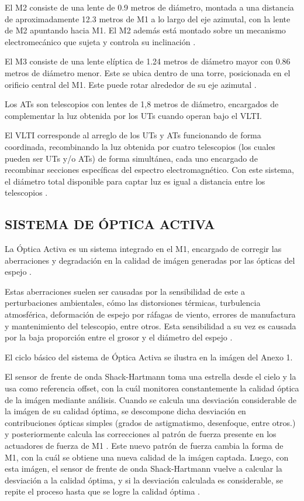 El M2 consiste de una lente de 0.9 metros de diámetro, montada a una distancia de aproximadamente 12.3 metros de M1 a lo largo del eje azimutal, con la lente de M2 apuntando hacia M1. El M2 además está montado sobre un mecanismo electromecánico que sujeta y controla su inclinación \cite{eso2011m2}.

El M3 consiste de una lente elíptica de 1.24 metros de diámetro mayor con 0.86 metros de diámetro menor. Este se ubica dentro de una torre, posicionada en el orificio central del M1. Este puede rotar alrededor de su eje azimutal \cite{eso2011m1}.

Los ATs son telescopios con lentes de 1,8 metros de diámetro, encargados de complementar la luz obtenida por los UTs cuando operan bajo el VLTI.

El VLTI corresponde al arreglo de los UTs y ATs funcionando de forma coordinada, recombinando la luz obtenida por cuatro telescopios (los cuales pueden ser UTs y/o ATs) de forma simultánea, cada uno encargado de recombinar secciones específicas del espectro electromagnético. Con este sistema, el diámetro total disponible para captar luz es igual a distancia entre los telescopios \cite{eso1998vlt}.

\subsection{SISTEMA DE ÓPTICA ACTIVA}
La Óptica Activa es un sistema integrado en el M1, encargado de corregir las aberraciones y degradación en la calidad de imágen generadas por las ópticas del espejo \cite{eso1998vlt}. 

Estas aberraciones suelen ser causadas por la sensibilidad de este a perturbaciones ambientales, cómo las distorsiones térmicas, turbulencia atmosférica, deformación de espejo por ráfagas de viento, errores de manufactura y mantenimiento del telescopio, entre otros. Esta sensibilidad a su vez es causada por la baja proporción entre el grosor y el diámetro del espejo \cite{wilson1987active}.

El ciclo básico del sistema de Óptica Activa se ilustra en la imágen del Anexo 1.

El sensor de frente de onda Shack-Hartmann toma una estrella desde el cielo y la usa como referencia offset, con la cuál monitorea constantemente la calidad óptica de la imágen mediante análisis. Cuando se calcula una desviación considerable de la imágen de su calidad óptima, se descompone dicha desviación en contribuciones ópticas simples (grados de astigmatismo, desenfoque, entre otros.) y posteriormente calcula las correcciones al patrón de fuerza presente en los actuadores de fuerza de M1 \cite{eso1998vlt}.
Este nuevo patrón de fuerza cambia la forma de M1, con la cuál se obtiene una nueva calidad de la imágen captada. Luego, con esta imágen, el sensor de frente de onda Shack-Hartmann vuelve a calcular la desviación a la calidad óptima, y si la desviación calculada es considerable, se repite el proceso hasta que se logre la calidad óptima \cite{eso1998vlt}\cite{wilson1987active}.

